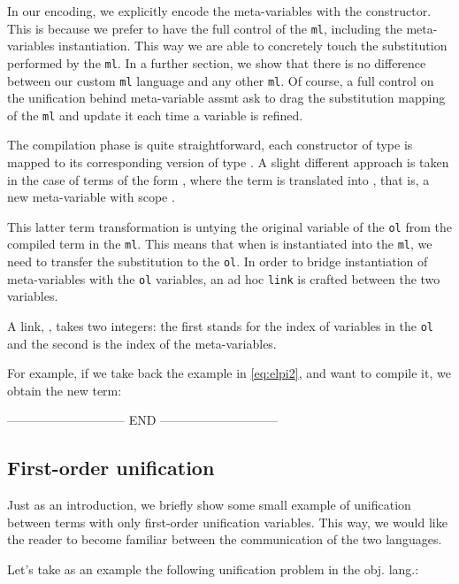\documentclass[sigconf,natbib=false]{acmart}
\newcommand*{\acronym}[1]{\texttt{#1}\xspace}
\def\ol{\acronym{ol}} %
\def\ml{\acronym{ml}} %
\begin{document}
In our encoding, we explicitly encode the meta-variables with the 
constructor. This is because we prefer to have the full control of the \ml,
including the meta-variables instantiation. This way we are able to concretely
touch the substitution performed by the \ml. In a further section, we show that
there is no difference between our custom \ml language and any other \ml. Of
course, a full control on the unification behind meta-variable assmt ask to
drag the substitution mapping of the \ml and update it each time a variable is
refined.

The compilation phase is quite straightforward, each constructor of type
 is mapped to its corresponding version of type . A
slight different approach is taken in the case of terms of the form , where the term is translated into , that is, a
new meta-variable  with scope .

This latter term transformation is untying the original variable  of
the \ol from the compiled term in the \ml. This means that when  is
instantiated into the \ml, we need to transfer the substitution to the \ol. In
order to bridge instantiation of meta-variables with the \ol variables, an ad
hoc \texttt{link} is crafted between the two variables.

A link, , takes two integers: the first 
stands for the index of variables in the \ol and the second is the index of 
the meta-variables.

For example, if we take back the example in \cref{eq:elpi2}, and want to compile
it, we obtain the new term:




----------------------------- END -----------------------------
\subsection{First-order unification}

Just as an introduction, we briefly show some small example of unification
between terms with only first-order unification variables. This way, we would
like the reader to become familiar between the communication of the two
languages.

Let's take as an example the following unification problem in the obj. lang.: 
\end{document}
